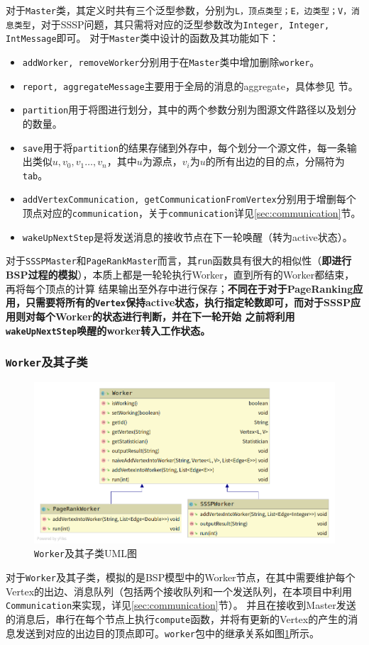 \documentclass{ML}
\begin{document}
对于\texttt{Master}类，其定义时共有三个泛型参数，分别为\texttt{L，顶点类型；E，边类型；V，消息类型}，对于SSSP问题，其只需将对应的泛型参数改为\texttt{Integer, Integer, IntMessage}即可。
对于\texttt{Master}类中设计的函数及其功能如下：
\begin{itemize}
    \item \texttt{addWorker, removeWorker}分别用于在\texttt{Master}类中增加删除\texttt{worker}。
    \item \texttt{report, aggregateMessage}主要用于全局的消息的aggregate，具体参见 节。%
    \item \texttt{partition}用于将图进行划分，其中的两个参数分别为图源文件路径以及划分的数量。
    \item \texttt{save}用于将\texttt{partition}的结果存储到外存中，每个划分一个源文件，每一条输出类似$u,v_0,v_1\dots,v_n$，其中$u$为源点，$v_i$为$u$的所有出边的目的点，分隔符为\texttt{tab}。
    \item \texttt{addVertexCommunication, getCommunicationFromVertex}分别用于增删每个顶点对应的\texttt{communication}，关于\texttt{communication}详见\ref{sec:communication}节。
    \item \texttt{wakeUpNextStep}是将发送消息的接收节点在下一轮唤醒（转为active状态）。
\end{itemize}

对于\texttt{SSSPMaster}和\texttt{PageRankMaster}而言，其\texttt{run}函数具有很大的相似性（\textbf{即进行BSP过程的模拟}），本质上都是一轮轮执行Worker，直到所有的Worker都结束，再将每个顶点的计算
结果输出至外存中进行保存；\textbf{不同在于对于PageRanking应用，只需要将所有的\texttt{Vertex}保持active状态，执行指定轮数即可，而对于SSSP应用则对每个Worker的状态进行判断，并在下一轮开始
之前将利用\texttt{wakeUpNextStep}唤醒的worker转入工作状态。}

\subsubsection{\texttt{Worker}及其子类}
\begin{figure}[htb]
    \centering
    \includegraphics[width=0.7\linewidth]{media/worker.png}
    \caption{\texttt{Worker}及其子类UML图}\label{fig:worker}
\end{figure}
对于\texttt{Worker}及其子类，模拟的是BSP模型中的Worker节点，在其中需要维护每个Vertex的出边、消息队列（包括两个接收队列和一个发送队列，在本项目中利用\texttt{Communication}来实现，详见\ref{sec:communication}节）。
并且在接收到Master发送的消息后，串行在每个节点上执行\texttt{compute}函数，并将有更新的Vertex的产生的消息发送到对应的出边目的顶点即可。\texttt{worker}包中的继承关系如图\ref{fig:worker}所示。
\end{document}
